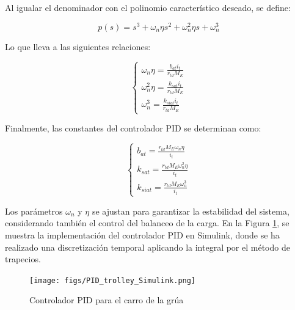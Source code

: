 \documentclass{article}
\begin{document}
            Al igualar el denominador con el polinomio característico deseado, se define:
            
            \begin{equation}\label{(eq:polinomio)}
                p(s) = s^3 + \omega_n \eta s^2 + \omega_n^2 \eta s + \omega_n^3
            \end{equation}
            
            Lo que lleva a las siguientes relaciones:
            
            \begin{equation}
                \begin{cases}
                    \omega_n \eta = \frac{b_{at} i_t}{r_{td}M_E} \\
                    \omega_n^2 \eta = \frac{k_{sat} i_t}{r_{td}M_E} \\
                    \omega_n^3 = \frac{k_{siat} i_t}{r_{td}M_E}
                \end{cases}
            \end{equation}
            
            Finalmente, las constantes del controlador PID se determinan como:
            
            \begin{equation}
                \begin{cases}
                    b_{at} = \frac{r_{td}M_E \omega_n \eta}{i_t} \\
                    k_{sat} = \frac{r_{td}M_E \omega_n^2 \eta}{i_t} \\
                    k_{siat} = \frac{r_{td}M_E \omega_n^3}{i_t}
                \end{cases}
            \end{equation}
            
            Los parámetros $\omega_n$ y $\eta$ se ajustan para garantizar la estabilidad del sistema, considerando también el control del balanceo de la carga. En la Figura \ref{fig:pid_trolley_simulink}, se muestra la implementación del controlador PID en Simulink, donde se ha realizado una discretización temporal aplicando la integral por el método de trapecios.
            
            \begin{figure}[H]
                \centering
                \texttt{[image: figs/PID\_trolley\_Simulink.png]}
                \caption{Controlador PID para el carro de la grúa}
                \label{fig:pid_trolley_simulink}
            \end{figure}
            
\end{document}

